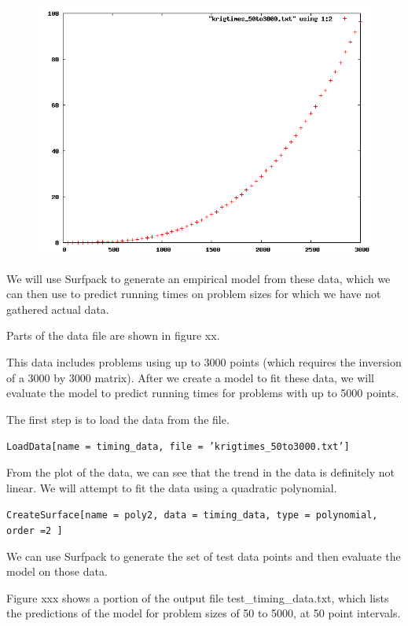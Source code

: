 \documentclass{article}
\begin{document}
\begin{figure}[htbp]
\includegraphics[width=12cm]{kriging_times_50to3000.png}
\end{figure}

We will use Surfpack to generate an empirical model from these data, which we can then use to predict running times on problem sizes for which we have not gathered actual data.

Parts of the data file are shown in figure xx.
 

This data includes problems using up to 3000 points (which requires the inversion of a 3000 by 3000 matrix).  After we create a model to fit these data, we will evaluate the model to predict running times for problems with up to 5000 points.

The first step is to load the data from the file.

\texttt{LoadData[name = timing\_data, file = 'krigtimes\_50to3000.txt']}

From the plot of the data, we can see that the trend in the data is definitely not linear.  We will attempt to fit the data using a quadratic polynomial.

\texttt{CreateSurface[name = poly2, data = timing\_data, type = polynomial, order =2 ]}

We can use Surfpack to generate the set of test data points and then evaluate the model on those data. 


Figure xxx shows a portion of the output file test\_timing\_data.txt, which lists the predictions of the model for problem sizes of 50 to 5000, at 50 point intervals.
\end{document}
